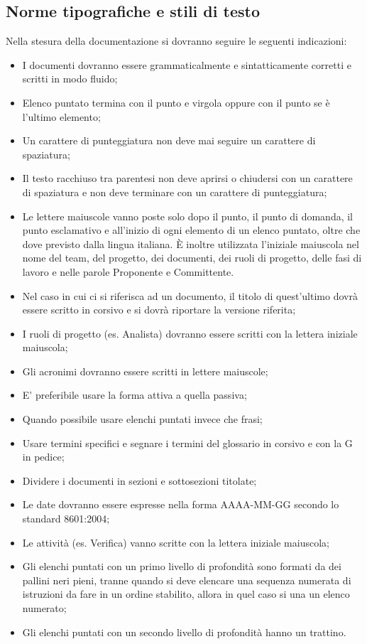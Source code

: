 \subsection{Norme tipografiche e stili di testo}
\label{5.4}
Nella stesura della documentazione si dovranno seguire le seguenti indicazioni:
\begin{itemize}
\item I documenti dovranno essere grammaticalmente e sintatticamente corretti e scritti in modo fluido;
\item Elenco puntato termina con il punto e virgola oppure con il punto se è l'ultimo elemento;
\item Un carattere di punteggiatura non deve mai seguire un carattere di spaziatura;
\item Il testo racchiuso tra parentesi non deve aprirsi o chiudersi con un carattere di spaziatura e non deve terminare con un carattere di punteggiatura;
\item Le lettere maiuscole vanno poste solo dopo il punto, il punto di domanda, il punto esclamativo e all'inizio di ogni elemento di un elenco puntato, oltre che dove previsto dalla lingua italiana. È inoltre utilizzata l'iniziale maiuscola nel nome del team, del progetto, dei documenti, dei ruoli di progetto, delle fasi di lavoro e nelle parole Proponente e Committente.
\item Nel caso in cui ci si riferisca ad un documento, il titolo di quest'ultimo dovrà essere scritto in corsivo e si dovrà riportare la versione riferita;
\item I ruoli di progetto (es. Analista) dovranno essere scritti con la lettera iniziale maiuscola;
\item Gli acronimi dovranno essere scritti in lettere maiuscole;
\item E' preferibile usare la forma attiva a quella passiva;
\item Quando possibile usare elenchi puntati invece che frasi;
\item Usare termini specifici e segnare i termini del glossario in corsivo e con la G in pedice;
\item Dividere i documenti in sezioni e sottosezioni titolate;
\item Le date dovranno essere espresse nella forma AAAA-MM-GG secondo lo standard  8601:2004;
\item Le attività (es. Verifica) vanno scritte con la lettera iniziale maiuscola;
\item Gli elenchi puntati con un primo livello di profondità sono formati da dei pallini neri pieni, tranne quando si deve
elencare una sequenza numerata di istruzioni da fare in un ordine stabilito, allora in quel caso si una un elenco numerato; \item Gli elenchi puntati con un secondo livello di profondità hanno un trattino.
\end{itemize}

